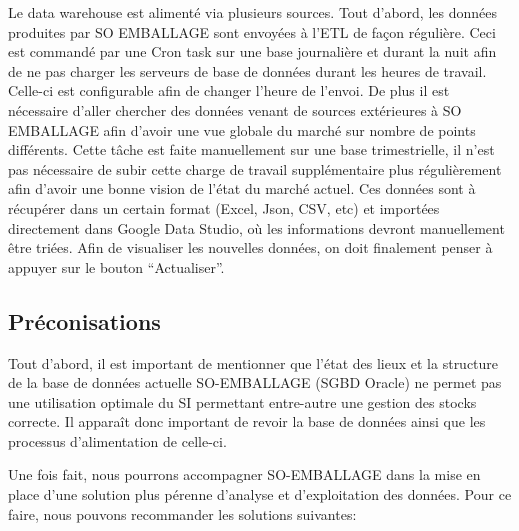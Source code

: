 Le data warehouse est alimenté via plusieurs sources. Tout d'abord, les données produites par SO EMBALLAGE sont envoyées à l'ETL de façon régulière. Ceci est commandé par une Cron task sur une base journalière et durant la nuit afin de ne pas charger les serveurs de base de données durant les heures de travail. Celle-ci est configurable afin de changer l'heure de l'envoi. De plus il est nécessaire d'aller chercher des données venant de sources extérieures à SO EMBALLAGE afin d'avoir une vue globale du marché sur nombre de points différents. Cette tâche est faite manuellement sur une base trimestrielle, il n'est pas nécessaire de subir cette charge de travail supplémentaire plus régulièrement afin d'avoir une bonne vision de l'état du marché actuel. Ces données sont à récupérer dans un certain format (Excel, Json, CSV, etc) et importées directement dans Google Data Studio, où les informations devront manuellement être triées. Afin de visualiser les nouvelles données, on doit finalement penser à appuyer sur le bouton “Actualiser”. 

\subsection{Préconisations}

Tout d’abord, il est important de mentionner que l’état des lieux et la structure de la base de données actuelle SO-EMBALLAGE (SGBD Oracle) ne permet pas une utilisation optimale du SI permettant entre-autre une gestion des stocks correcte. Il apparaît donc important de revoir la base de données ainsi que les processus d’alimentation de celle-ci.  

Une fois fait, nous pourrons accompagner SO-EMBALLAGE dans la mise en place d'une solution plus pérenne d'analyse et d'exploitation des données. Pour ce faire, nous pouvons recommander les solutions suivantes:

